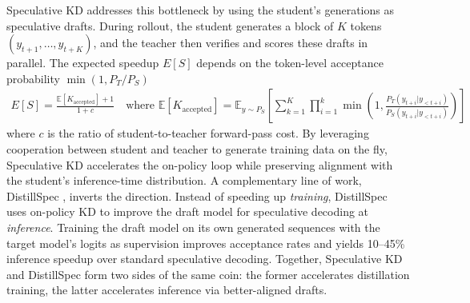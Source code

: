 \documentclass{article} %
\begin{document}
Speculative KD \citep{2410.11325} addresses this bottleneck by using the student's generations as speculative drafts. During rollout, the student generates a block of $K$ tokens $(y_{t+1}, \dots, y_{t+K})$, and the teacher then verifies and scores these drafts in parallel. The expected speedup $E[S]$ depends on the token-level acceptance probability $\min(1, P_T/P_S)$
\begin{align}
E[S] = \frac{\mathbb{E}[K_{\text{accepted}}] + 1}{1 + c} \quad \text{where } \mathbb{E}[K_{\text{accepted}}] = \mathbb{E}_{y \sim P_S}\!\left[\sum_{k=1}^K \prod_{i=1}^k \min \left(1, \frac{P_T(y_{t+i} | y_{<t+i})}{P_S(y_{t+i} | y_{<t+i})} \right)\right]
\end{align}
where $c$ is the ratio of student-to-teacher forward-pass cost. By leveraging cooperation between student and teacher to generate training data on the fly, Speculative KD accelerates the on-policy loop while preserving alignment with the student's inference-time distribution. A complementary line of work, DistillSpec \citep{2310.08461}, inverts the direction. Instead of speeding up \emph{training}, DistillSpec uses on-policy KD to improve the draft model for speculative decoding at \emph{inference}. Training the draft model on its own generated sequences with the target model's logits as supervision improves acceptance rates and yields 10--45\% inference speedup over standard speculative decoding. Together, Speculative KD and DistillSpec form two sides of the same coin: the former accelerates distillation training, the latter accelerates inference via better-aligned drafts.
\end{document}
